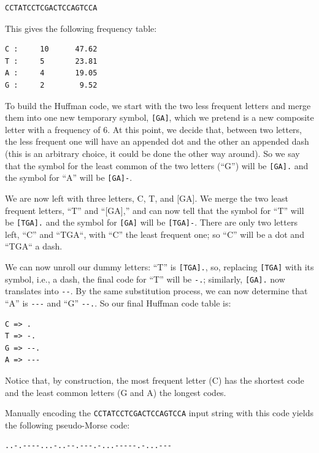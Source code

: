 \begin{verbatim}
CCTATCCTCGACTCCAGTCCA
\end{verbatim}

This gives the following frequency table:

\begin{verbatim}
C :     10      47.62
T :     5       23.81
A :     4       19.05
G :     2        9.52
\end{verbatim}

To build the Huffman code, we start with the two less frequent 
letters and merge them into one new temporary symbol, \verb"[GA]", 
which we pretend is a new composite letter with a 
frequency of 6. At this point, we decide that, between two letters, 
the less frequent one will have an appended dot and the other 
an appended dash (this is an arbitrary choice, it could be done 
the other way around). So we say that the symbol for the least 
common of the two letters (``G'') will be \verb'[GA].' and the 
symbol for ``A'' will be \verb'[GA]-'. 

We are now left with three letters, C, T, and [GA]. We merge the 
two least frequent letters, ``T'' and ``[GA],'' and can now tell 
that the symbol for ``T'' will be \verb'[TGA].' and the symbol for 
\verb'[GA]' will be \verb'[TGA]-'. There are only two letters left, 
``C'' and ``TGA``, with ``C'' the least frequent one; so ``C'' will 
be a dot and ``TGA`` a dash. 

We can now unroll our dummy letters: ``T'' is \verb'[TGA].', so, 
replacing \verb'[TGA]' with its symbol, i.e., a dash, the 
final code for ``T'' will be \verb'-.'; similarly, \verb'[GA].' 
now translates into \verb'--'. By the same substitution process, 
we can now determine that ``A'' is \verb'---' and ``G'' 
\verb'--.'. So our final Huffman code table is:

\begin{verbatim}
C => .
T => -.
G => --.
A => ---
\end{verbatim}

Notice that, by construction, the most frequent letter (C) 
has the shortest code and the least common letters (G and A) 
the longest codes.

Manually encoding the \verb'CCTATCCTCGACTCCAGTCCA' input string 
with this code yields the following pseudo-Morse code:

\begin{verbatim}
..-.----...-..--.---.-...-----.-...---
\end{verbatim}

